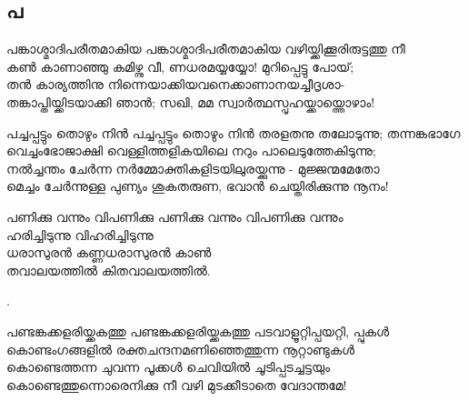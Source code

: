 \subsection{പ}
\begin{enumerate}


\begin{slokam}{\VSv}{\VNM}{പങ്കാശ്മാദിപരീതമാകിയ}
പങ്കാശ്മാദിപരീതമാകിയ വഴിയ്ക്കിക്കൂരിരുട്ടത്തു നീ \\
കൺ കാണാഞ്ഞു കമിഴ്ന്നു വീ, ണധരമയ്യയ്യോ! മുറിപ്പെട്ടു പോയ്; \\
തൻ കാര്യത്തിനു നിന്നെയാക്കിയവനെക്കാണാനയച്ചീദൃശാ- \\
തങ്കാപ്തിയ്ക്കിടയാക്കി ഞാൻ; സഖി, മമ സ്വാർത്ഥസ്പൃഹയ്ക്കായ്ത്തൊഴാം! 
\end{slokam}



\begin{slokam}{\VSr}{\VNM}{പച്ചപ്പട്ടും തൊഴും നിൻ}
പച്ചപ്പട്ടും തൊഴും നിൻ തരളതനു തലോടുന്നു; തന്നങ്കഭാഗേ\\
വെച്ചംഭോജാക്ഷി വെള്ളിത്തളികയിലെ നറും പാലെടുത്തേകിടുന്നു;\\
നൽച്ചന്തം ചേർന്ന നർമ്മോക്തികളിടയിലുരയ്ക്കുന്നു - മുജ്ജന്മമേതോ\\
മെച്ചം ചേർന്നുള്ള പുണ്യം ശുകതരുണ, ഭവാൻ ചെയ്തിരിക്കുന്നു നൂനം!
\end{slokam}


\begin{slokam}{\VUv}{\AUK}{പണിക്കു വന്നും വിപണിക്കു}
പണിക്കു വന്നും വിപണിക്കു വന്നും\\
ഹരിച്ചിടുന്നു വിഹരിച്ചിടുന്നു\\
ധരാസുരൻ കണ്ണധരാസുരൻ കാൺ\\
തവാലയത്തിൽ കിതവാലയത്തിൽ.
\end{slokam}


.

\begin{slokam}{\VSv}{\VRV}{പണ്ടങ്കക്കളരിയ്ക്കകത്തു}
പണ്ടങ്കക്കളരിയ്ക്കകത്തു പടവാളൂറ്റിപ്പയറ്റി, പ്പുകൾ\\
കൊണ്ടംഗങ്ങളിൽ രക്തചന്ദനമണിഞ്ഞെത്തുന്ന നൂറ്റാണ്ടുകൾ\\
കൊണ്ടെത്തന്ന ചുവന്ന പൂക്കൾ ചെവിയിൽ ചൂടിപ്പടച്ചട്ടയും\\
കൊണ്ടെത്തുന്നൊരെനിക്കു നീ വഴി മുടക്കീടാതെ വേദാന്തമേ! 
\end{slokam}


\end{enumerate}
